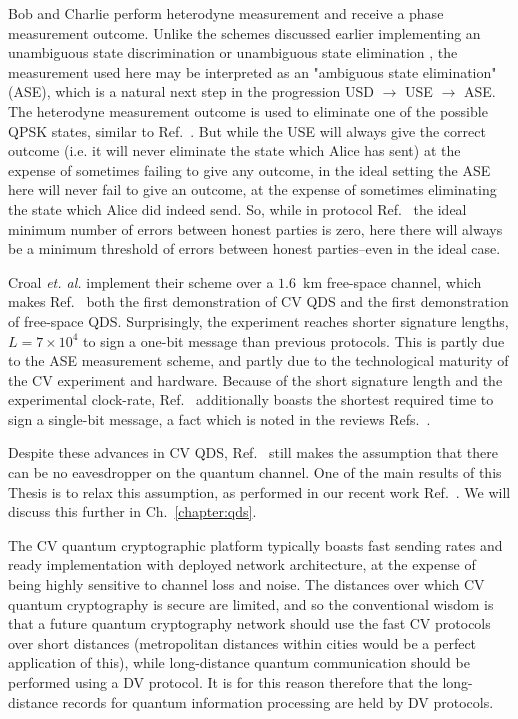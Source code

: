 Bob and Charlie perform heterodyne measurement and receive a phase measurement outcome. Unlike the schemes discussed earlier implementing an unambiguous state discrimination \cite{Dunjko2014} or unambiguous state elimination \cite{Donaldson2016}, the measurement used here may be interpreted as an "ambiguous state elimination" (ASE), which is a natural next step in the progression USD $\rightarrow$ USE $\rightarrow$ ASE. The heterodyne measurement outcome is used to eliminate one of the possible QPSK states, similar to Ref.~\cite{Donaldson2016}. But while the USE will always give the correct outcome (i.e. it will never eliminate the state which Alice has sent) at the expense of sometimes failing to give any outcome, in the ideal setting the ASE here will never fail to give an outcome, at the expense of sometimes eliminating the state which Alice did indeed send. So, while in protocol Ref.~\cite{Donaldson2016} the ideal minimum number of errors between honest parties is zero, here there will always be a minimum threshold of errors between honest parties--even in the ideal case.

Croal \emph{et. al.} implement their scheme over a $1.6$~km free-space channel, which makes Ref.~\cite{Croal2016} both the first demonstration of CV QDS and the first demonstration of free-space QDS. Surprisingly, the experiment reaches shorter signature lengths, $L = 7 \times 10^4$ to sign a one-bit message than previous protocols. This is partly due to the ASE measurement scheme, and partly due to the technological maturity of the CV experiment and hardware. Because of the short signature length and the experimental clock-rate, Ref.~\cite{Croal2016} additionally boasts the shortest required time to sign a single-bit message, a fact which is noted in the reviews Refs.~\cite{Collins2016, Collins2018}.

Despite these advances in CV QDS, Ref.~\cite{Croal2016} still makes the assumption that there can be no eavesdropper on the quantum channel. One of the main results of this Thesis is to relax this assumption, as performed in our recent work Ref.~\cite{Thornton2019}. We will discuss this further in Ch.~\ref{chapter:qds}.

The CV quantum cryptographic platform typically boasts fast sending rates and ready implementation with deployed network architecture, at the expense of being highly sensitive to channel loss and noise. The distances over which CV quantum cryptography is secure are limited, and so the conventional wisdom is that a future quantum cryptography network should use the fast CV protocols over short distances (metropolitan distances within cities would be a perfect application of this), while long-distance quantum communication should be performed using a DV protocol. It is for this reason therefore that the long-distance records for quantum information processing are held by DV protocols. %



